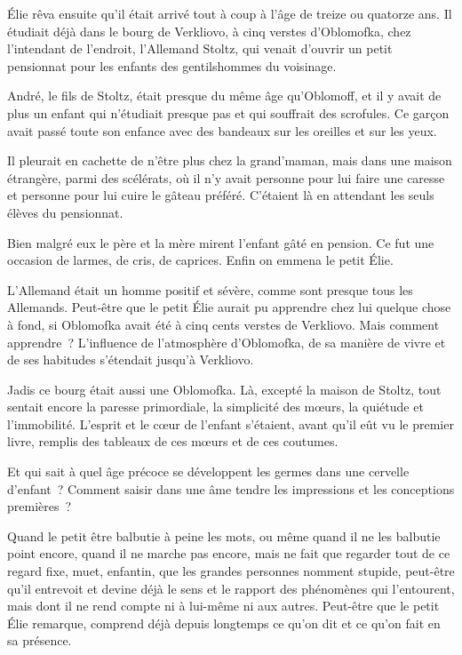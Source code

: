 \documentclass[french,twoside]{book} %
\begin{document}
\noindent Élie rêva ensuite qu’il était arrivé tout à coup à l’âge de treize ou quatorze ans. Il étudiait déjà dans le bourg de Verkliovo, à cinq verstes d’Oblomofka, chez l’intendant de l’endroit, l’Allemand Stoltz, qui venait d’ouvrir un petit pensionnat pour les enfants des gentilshommes du voisinage.\par
André, le fils de Stoltz, était presque du même âge qu’Oblomoff, et il y avait de plus un enfant qui n’étudiait presque pas et qui souffrait des scrofules. Ce garçon avait passé toute son enfance avec des bandeaux sur les oreilles et sur les yeux.\par
Il pleurait en cachette de n’être plus chez la grand’maman, mais dans une maison étrangère, parmi des scélérats, où il n’y avait personne pour lui faire une caresse et personne pour lui cuire le gâteau préféré. C’étaient là en attendant les seuls élèves du pensionnat.\par
Bien malgré eux le père et la mère mirent l’enfant gâté en pension. Ce fut une occasion de larmes, de cris, de caprices. Enfin on emmena le petit Élie.\par
L’Allemand était un homme positif et sévère, comme sont presque tous les Allemands. Peut-être que le petit Élie aurait pu apprendre chez lui quelque chose à fond, si Oblomofka avait été à cinq cents verstes de Verkliovo. Mais comment apprendre ? L’influence de l’atmosphère d’Oblomofka, de sa manière de vivre et de ses habitudes s’étendait jusqu’à Verkliovo.\par
Jadis ce bourg était aussi une Oblomofka. Là, excepté la maison de Stoltz, tout sentait encore la paresse primordiale, la simplicité des mœurs, la quiétude et l’immobilité. L’esprit et le cœur de l’enfant s’étaient, avant qu’il eût vu le premier livre, remplis des tableaux de ces mœurs et de ces coutumes.\par
Et qui sait à quel âge précoce se développent les germes dans une cervelle d’enfant ? Comment saisir dans une âme tendre les impressions et les conceptions premières ?\par
Quand le petit être balbutie à peine les mots, ou même quand il ne les balbutie point encore, quand il ne marche pas encore, mais ne fait que regarder tout de ce regard fixe, muet, enfantin, que les grandes personnes nomment stupide, peut-être qu’il entrevoit et devine déjà le sens et le rapport des phénomènes qui l’entourent, mais dont il ne rend compte ni à lui-même ni aux autres. Peut-être que le petit Élie remarque, comprend déjà depuis longtemps ce qu’on dit et ce qu’on fait en sa présence.\par
\end{document}
